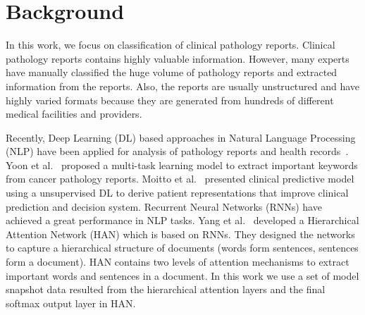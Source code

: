\section{Background}
\label{sec:background}

In this work, we focus on classification of clinical pathology reports.
Clinical pathology reports contains highly valuable information.
However, many experts have manually classified the huge volume of pathology reports and extracted information from the reports.
Also, the reports are usually unstructured and have highly varied formats because they are generated from hundreds of different medical facilities and providers.

Recently, Deep Learning (DL) based approaches in Natural Language Processing (NLP) have been applied for analysis of pathology reports and health records~\cite{yoon2016multi,miotto2016deep,qiu2017deep}.
Yoon et al.~\cite{yoon2016multi} proposed a multi-task learning model to extract important keywords from cancer pathology reports.
Moitto et al.~\cite{miotto2016deep} presented clinical predictive model using a unsupervised DL to derive patient representations that improve clinical prediction and decision system.
Recurrent Neural Networks (RNNs) have achieved a great performance in NLP tasks.
Yang et al.~\cite{yang2016hierarchical} developed a Hierarchical Attention Network (HAN) which is based on RNNs.
They designed the networks to capture a hierarchical structure of documents (words form sentences, sentences form a document).
HAN contains two levels of attention mechanisms to extract important words and sentences in a document.
In this work we use a set of model snapshot data resulted from the hierarchical attention layers and the final softmax output layer in HAN.
